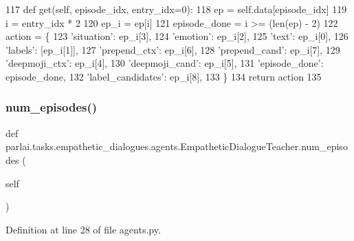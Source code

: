 \begin{DoxyCode}
117     \textcolor{keyword}{def }get(self, episode\_idx, entry\_idx=0):
118         ep = self.data[episode\_idx]
119         i = entry\_idx * 2
120         ep\_i = ep[i]
121         episode\_done = i >= (len(ep) - 2)
122         action = \{
123             \textcolor{stringliteral}{'situation'}: ep\_i[3],
124             \textcolor{stringliteral}{'emotion'}: ep\_i[2],
125             \textcolor{stringliteral}{'text'}: ep\_i[0],
126             \textcolor{stringliteral}{'labels'}: [ep\_i[1]],
127             \textcolor{stringliteral}{'prepend\_ctx'}: ep\_i[6],
128             \textcolor{stringliteral}{'prepend\_cand'}: ep\_i[7],
129             \textcolor{stringliteral}{'deepmoji\_ctx'}: ep\_i[4],
130             \textcolor{stringliteral}{'deepmoji\_cand'}: ep\_i[5],
131             \textcolor{stringliteral}{'episode\_done'}: episode\_done,
132             \textcolor{stringliteral}{'label\_candidates'}: ep\_i[8],
133         \}
134         \textcolor{keywordflow}{return} action
135 
\end{DoxyCode}
\mbox{\label{classparlai_1_1tasks_1_1empathetic__dialogues_1_1agents_1_1EmpatheticDialogueTeacher_a6859c7bc8c2c58f1c2ac23d7eb804eb7}} 
\subsubsection{\texorpdfstring{num\+\_\+episodes()}{num\_episodes()}}
{\footnotesize\ttfamily def parlai.\+tasks.\+empathetic\+\_\+dialogues.\+agents.\+Empathetic\+Dialogue\+Teacher.\+num\+\_\+episodes (\begin{DoxyParamCaption}\item[{}]{self }\end{DoxyParamCaption})}



Definition at line 28 of file agents.\+py.



